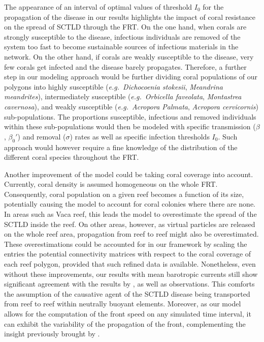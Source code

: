 \documentclass[utf8]{frontiersSCNS}
\newcommand{\eg}{{\it e.g.}\ }
\begin{document}
The appearance of an interval of optimal values of threshold $I_0$ for the propagation of the disease in our results highlights the impact of coral resistance on the spread of SCTLD through the FRT. On the one hand, when corals are strongly susceptible to the disease, infectious individuals are removed of the system too fast to become sustainable sources of infectious materials in the network. On the other hand, if corals are weakly susceptible to the disease, very few corals get infected and the disease barely propagates. Therefore, a further step in our modeling approach would be further dividing coral populations of our polygons into highly susceptible (\eg \textit{Dichocoenia stokesii}, \textit{Meandrina meandrites}), intermediately susceptible (\eg \textit{Orbicella faveolata}, \textit{Montastrea cavernosa}), and weakly susceptible (\eg \textit{Acropora Palmata}, \textit{Acropora cervicornis}) sub-populations. The proportions susceptible, infectious and removed individuals within these sub-populations would then be modeled with specific transmission ($\beta$, $\beta_0'$) and removal ($\sigma$) rates as well as specific infection thresholds $I_0$. Such approach would however require a fine knowledge of the distribution of the different coral species throughout the FRT. 

Another improvement of the model could be taking coral coverage into account. Currently, coral density is assumed homogeneous on the whole FRT. Consequently, coral population on a given reef becomes a function of its size, potentially causing the model to account for coral colonies where there are none. In areas such as Vaca reef, this leads the model to overestimate the spread of the SCTLD inside the reef. On other areas, however, as virtual particles are released on the whole reef area, propagation from reef to reef might also be overestimated. These overestimations could be accounted for in our framework by scaling the entries the potential connectivity matrices with respect to the coral coverage of each reef polygon, provided that such refined data is available. Nonetheless, even without these improvements, our results with mean barotropic currents still show significant agreement with the results by \cite{muller2020spatial}, as well as observations. This comforts the assumption of the causative agent of the SCTLD disease being transported from reef to reef within neutrally buoyant elements. Moreover, as our model allows for the computation of the front speed on any simulated time interval, it can exhibit the variability of the propagation of the front, complementing the insight previously brought by \cite{muller2020spatial}.
\end{document}

